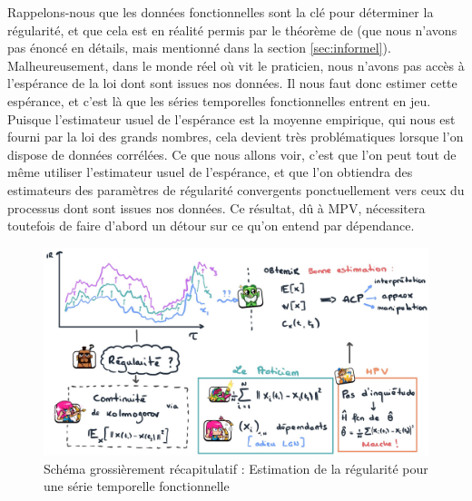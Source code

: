 Rappelons-nous que les données fonctionnelles sont la clé pour déterminer la régularité, et que cela est en réalité permis par le théorème de  (que nous n'avons pas énoncé en détails, mais mentionné dans la section \ref{sec:informel}). Malheureusement, dans le monde réel où vit le praticien, nous n'avons pas accès à l'espérance de la loi dont sont issues nos données. Il nous faut donc estimer cette espérance, et c'est là que les séries temporelles fonctionnelles entrent en jeu. Puisque l'estimateur usuel de l'espérance est la moyenne empirique, qui nous est fourni par la loi des grands nombres, cela devient très problématiques lorsque l'on dispose de données corrélées. Ce que nous allons voir, c'est que l'on peut tout de même utiliser l'estimateur usuel de l'espérance, et que l'on obtiendra des estimateurs des paramètres de régularité convergents ponctuellement vers ceux du processus dont sont issues nos données. Ce résultat, dû à MPV, nécessitera toutefois de faire d'abord un détour sur ce qu'on entend par dépendance.

\begin{figure}[H]
    \centering
    \includegraphics[width=\textwidth]{Images/sketches/schema_ts_estim_reg.jpg}
    \caption{Schéma grossièrement récapitulatif : Estimation de la régularité pour une série temporelle fonctionnelle}
    \label{fig:recap_estim_reg_fts}
\end{figure}

